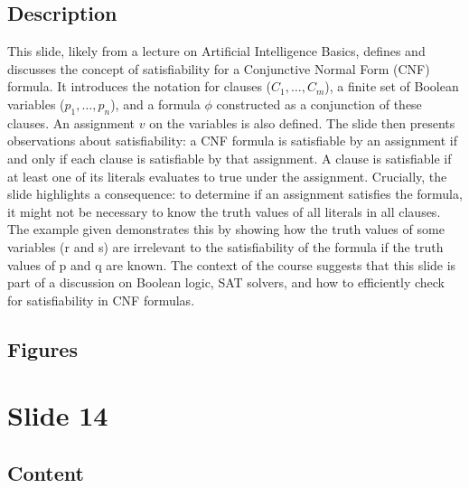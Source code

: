 \documentclass{article}%
\begin{document}
\subsection{Description}%
This slide, likely from a lecture on Artificial Intelligence Basics, defines and discusses the concept of satisfiability for a Conjunctive Normal Form (CNF) formula.  It introduces the notation for clauses ($C_1, \dots, C_m$), a finite set of Boolean variables ($p_1, \dots, p_n$), and a formula $\phi$ constructed as a conjunction of these clauses.  An assignment $v$ on the variables is also defined.  The slide then presents observations about satisfiability: a CNF formula is satisfiable by an assignment if and only if each clause is satisfiable by that assignment.  A clause is satisfiable if at least one of its literals evaluates to true under the assignment.  Crucially, the slide highlights a consequence: to determine if an assignment satisfies the formula, it might not be necessary to know the truth values of all literals in all clauses.  The example given demonstrates this by showing how the truth values of some variables (r and s) are irrelevant to the satisfiability of the formula if the truth values of p and q are known.  The context of the course suggests that this slide is part of a discussion on Boolean logic, SAT solvers, and how to efficiently check for satisfiability in CNF formulas.%
\subsection{Figures}%
\begin{figure}[H]%
\centering%
\end{figure}

%
\newpage%
\section{Slide 14}%
\label{sec:Slide14}%
\subsection{Content}%
\end{document}
